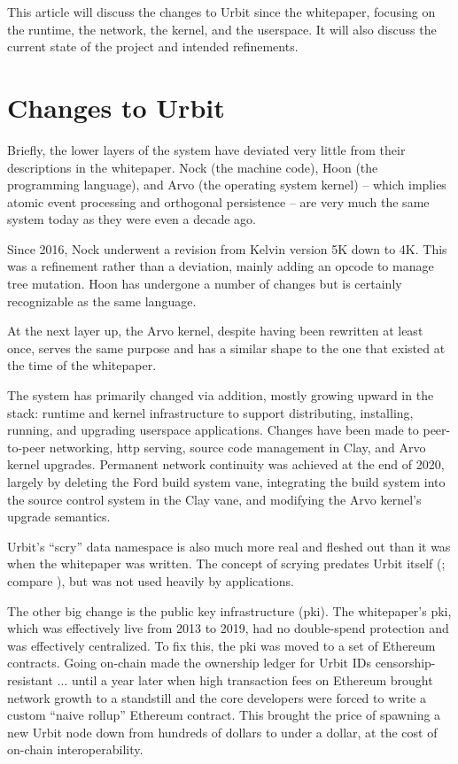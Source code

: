 \documentclass[twoside]{article}
\begin{document}
\noindent
This article will discuss the changes to Urbit since the whitepaper, focusing on the runtime, the network, the kernel, and the userspace.  It will also discuss the current state of the project and intended refinements.


\section{Changes to Urbit}

Briefly, the lower layers of the system have deviated very little from their descriptions in the whitepaper.  Nock (the machine code), Hoon (the programming language), and Arvo (the operating system kernel) – which implies atomic event processing and orthogonal persistence – are very much the same system today as they were even a decade ago.

Since 2016, Nock underwent a revision from Kelvin version 5K down to 4K.  This was a refinement rather than a deviation, mainly adding an opcode to manage tree mutation.  Hoon has undergone a number of changes but is certainly recognizable as the same language.

At the next layer up, the Arvo kernel, despite having been rewritten at least once, serves the same purpose and has a similar shape to the one that existed at the time of the whitepaper.

\sloppy
The system has primarily changed via addition, mostly growing upward in the stack: runtime and kernel infrastructure to support distributing, installing, running, and upgrading user\-space applications.  Changes have been made to peer-to-peer networking, {\sc http} serving, source code management in Clay, and Arvo kernel upgrades.  Permanent network continuity was achieved at the end of 2020, largely by deleting the Ford build system vane, integrating the build system into the source control system in the Clay vane, and modifying the Arvo kernel's upgrade semantics.

Urbit's ``scry'' data namespace is also much more real and fleshed out than it was when the whitepaper was written.  The concept of scrying predates Urbit itself (\citet{Yarvin2006a}; compare \citet{Yarvin2010}), but was not used heavily by applications.

The other big change is the public key infrastructure ({\sc pki}).  The whitepaper's {\sc pki}, which was effectively live from 2013 to 2019, had no double-spend protection and was effectively centralized.  To fix this, the {\sc pki} was moved to a set of Ethereum contracts.  Going on-chain made the ownership ledger for Urbit IDs censorship-resistant ... until a year later when high transaction fees on Ethereum brought network growth to a standstill and the core developers were forced to write a custom ``naive rollup'' Ethereum contract.  This brought the price of spawning a new Urbit node down from hundreds of dollars to under a dollar, at the cost of on-chain interoperability.
\end{document}
